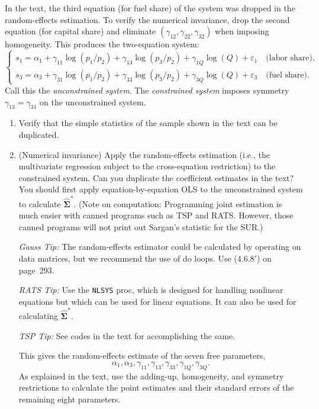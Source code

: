 \begin{problemset}
In the text, the third equation (for fuel share) of the system was dropped in
the random-effects estimation. To verify the numerical invariance, drop the second
equation (for capital share) and eliminate $(\gamma_{12}, \gamma_{22}, \gamma_{32})$
when imposing homogeneity. This produces the two-equation system:
\[
\begin{cases}
s_1 = \alpha_1 + \gamma_{11} \log(p_1/p_2) + \gamma_{13} \log(p_3/p_2)
+ \gamma_{1Q} \log(Q) + \varepsilon_1
\quad \text{(labor share),} \\
s_3 = \alpha_3 + \gamma_{31} \log(p_1/p_2) + \gamma_{33} \log(p_3/p_2)
+ \gamma_{3Q} \log(Q) + \varepsilon_3
\quad \text{(fuel share).}
\end{cases}
\]
Call this the \textit{unconstrained system}. The \textit{constrained system} imposes
symmetry $\gamma_{13} = \gamma_{31}$ on the unconstrained system.

\begin{enumerate}[label=(\alph*)]
\item Verify that the simple statistics of the sample shown in the text can be
duplicated.

\item (Numerical invariance)\quad
Apply the random-effects estimation (i.e., the multivariate regression subject to
the cross-equation restriction) to the constrained system. Can you duplicate the
coefficient estimates in the text? You should first apply equation-by-equation OLS
to the unconstrained system to calculate
$\widehat{\boldsymbol{\Sigma}}^*$. (Note on computation: Programming joint
estimation is much easier with canned programs such as TSP and RATS.
However, those canned programs will not print out Sargan's statistic for the SUR.)

\textit{Gauss Tip:} The random-effects estimator could be calculated by operating
on data matrices, but we recommend the use of do loops.
Use (4.6.8$'$) on page~293.

\textit{RATS Tip:} Use the \texttt{NLSYS} proc, which is designed for handling nonlinear
equations but which can be used for linear equations. It can also be used for
calculating $\widehat{\boldsymbol{\Sigma}}^*$.

\textit{TSP Tip:} See codes in the text for accomplishing the same.

This gives the random-effects estimate of the seven free parameters,
\[
\alpha_1, \alpha_3, \gamma_{11}, \gamma_{13}, \gamma_{33},
\gamma_{1Q}, \gamma_{3Q}.
\]
As explained in the text, use the adding-up, homogeneity, and symmetry
restrictions to calculate the point estimates and their standard errors of the
remaining eight parameters.


\end{enumerate}
\end{problemset}
